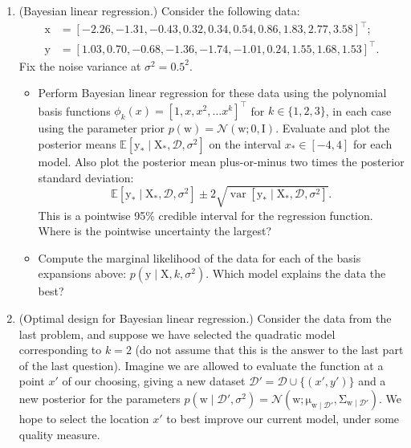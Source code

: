 \documentclass{article}
\newcommand{\given}{\mid}
\newcommand{\mc}[1]{\mathcal{#1}}
\newcommand{\data}{\mc{D}}
\newcommand{\mat}[1]{\bm{\mathrm{#1}}}
\renewcommand{\vec}[1]{\bm{\mathrm{#1}}}
\newcommand{\trans}{^\top}
\DeclareMathOperator{\var}{var}
\begin{document}
\begin{enumerate}
\item
  (Bayesian linear regression.)
  Consider the following data:
  \begin{align*}
    \vec{x}
    &=
    [-2.26, -1.31, -0.43, 0.32, 0.34, 0.54, 0.86, 1.83, 2.77, 3.58]\trans; \\
    \vec{y}
    &=
    [1.03, 0.70, -0.68, -1.36, -1.74, -1.01, 0.24, 1.55, 1.68, 1.53]\trans.
  \end{align*}
  Fix the noise variance at $\sigma^2 = 0.5^2$.
  \begin{itemize}
  \item
    Perform Bayesian linear regression for these data using the
    polynomial basis functions $\phi_k(x) = [1, x, x^2, \dotsc
      x^k]\trans$ for $k \in \{1, 2, 3\}$, in each case using the
    parameter prior $p(\vec{w}) = \mc{N}(\vec{w}; \vec{0}, \mat{I})$.
    Evaluate and plot the posterior means $\mathbb{E}[\vec{y}_\ast
      \given \mat{X}_\ast, \data, \sigma^2]$ on the interval $x_\ast
    \in [-4, 4]$ for each model.  Also plot the posterior mean
    plus-or-minus two times the posterior standard deviation:
    \begin{equation*}
      \mathbb{E}[\vec{y}_\ast \given \mat{X}_\ast, \data, \sigma^2] \pm
      2 \sqrt{\var[\vec{y}_\ast \given \mat{X}_\ast, \data, \sigma^2]}.
    \end{equation*}
    This is a pointwise 95\% credible interval for the regression
    function.  Where is the pointwise uncertainty the largest?
  \item
    Compute the marginal likelihood of the data for each of the basis
    expansions above: $p(\vec{y} \given \mat{X}, k, \sigma^2)$.  Which
    model explains the data the best?
  \end{itemize}

\item
  (Optimal design for Bayesian linear regression.)
  Consider the data from the last problem, and suppose we have
  selected the quadratic model corresponding to $k = 2$ (do not assume
  that this is the answer to the last part of the last question).
  Imagine we are allowed to evaluate the function at a point $x'$ of
  our choosing, giving a new dataset $\data' = \data \cup \bigl\{ (x',
  y') \bigr\}$ and a new posterior for the parameters $p(\vec{w}
  \given \data', \sigma^2) = \mc{N}(\vec{w};
  \vec{\mu}_{\vec{w}\given\data'},
  \mat{\Sigma}_{\vec{w}\given\data'})$.  We hope to select the
  location $x'$ to best improve our current model, under some quality
  measure.


\end{enumerate}
\end{document}
